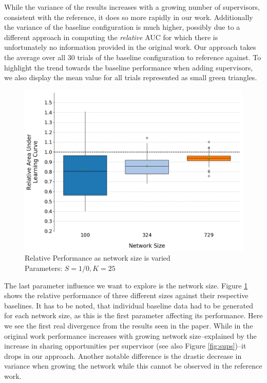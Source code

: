 \documentclass[letterpaper]{article}
\begin{document}
While the variance of the results increases with a growing number of supervisors, consistent with the reference, it does so more rapidly in our work. Additionally the variance of the baseline configuration is much higher, possibly due to a different approach in computing the \textit{relative} AUC for which there is unfortunately no information provided in the original work. Our approach takes the average over all 30 trials of the baseline configuration to reference against. To highlight the trend towards the baseline performance when adding supervisors, we also display the mean value for all trials represented as small green triangles.
\begin{figure}[H]
 \begin{center}
  \includegraphics[width=\linewidth]{figures/figure8}
  \caption{Relative Performance as network size is varied\\Parameters: $S=1/0,K=25$}
  \label{fig:sizes}
 \end{center}
\end{figure}

The last parameter influence we want to explore is the network size. Figure \ref{fig:sizes} shows the relative performance of three different sizes against their respective baselines. It has to be noted, that individual baseline data had to be generated for each network size, as this is the first parameter affecting its performance. Here we see the first real divergence from the results seen in the paper. While in the original work performance increases with growing network size--explained by the increase in sharing opportunities per supervisor (see also Figure \ref{fig:sups})--it drops in our approach. Another notable difference is the drastic decrease in variance when growing the network while this cannot be observed in the reference work.
\end{document}
